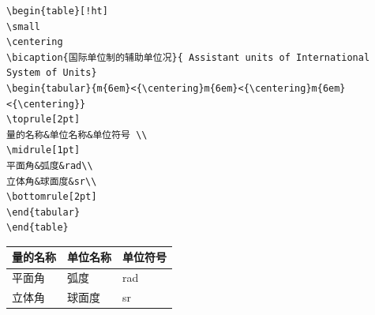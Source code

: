 \begin{lstlisting}[caption={表3.2绘制代码}]
\begin{table}[!ht]
\small
\centering
\bicaption{国际单位制的辅助单位况}{ Assistant units of International System of Units} 
\begin{tabular}{m{6em}<{\centering}m{6em}<{\centering}m{6em}<{\centering}}
\toprule[2pt]
量的名称&单位名称&单位符号 \\
\midrule[1pt]
平面角&弧度&rad\\
立体角&球面度&sr\\
\bottomrule[2pt]
\end{tabular}
\end{table}
\end{lstlisting}
\begin{table}[!ht]
	\small
	\centering
	\begin{tabular}{m{6em}<{\centering}m{6em}<{\centering}m{6em}<{\centering}}
		\toprule[2pt]
		量的名称&单位名称&单位符号 \\
		\midrule[1pt]
		平面角&弧度&rad\\
		立体角&球面度&sr\\
		\bottomrule[2pt]
	\end{tabular}
\end{table}
